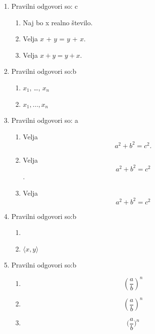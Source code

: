 \documentclass[11pt]{article}
\begin{document}
\begin{enumerate}
    \item Pravilni odgovori so: c%
    \begin{enumerate}
        \item Naj bo x realno število.
        \item Velja \(x\) + \(y\) = \(y\) + \(x\).
        \item Velja \(x + y = y + x\).
    \end{enumerate}

    \item Pravilni odgovori so:b %
    \begin{enumerate}
        \item \(x_1\), \dots, \(x_n\)
        \item \(x_1, \ldots, x_n\)
    \end{enumerate}

    \item Pravilni odgovori so: a %
    \begin{enumerate}
        \item
Velja
\[
  a^2 + b^2 = c^2.
\]
        \item
Velja
\[
  a^2 + b^2 = c^2
\]
.
        \item
Velja
\[
  a^2 + b^2 = c^2
\]
    \end{enumerate}

    \item Pravilni odgovori so:b %
    \begin{enumerate}
        \item \(<x, y>\)
        \item \(\langle x, y \rangle\)
    \end{enumerate}

    \item Pravilni odgovori so:b %
    \begin{enumerate}
        \item \[ (\frac{a}{b})^n \]
        \item \[ \left(\frac{a}{b}\right)^n \]
        \item \[ \Big(\frac{a}{b}\Big)^n \]
    \end{enumerate}


\end{enumerate}
\end{document}
